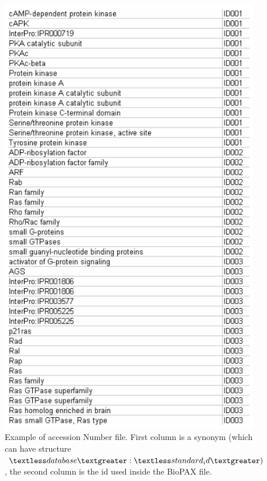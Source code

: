 \begin{figure}[h]
\centering
\includegraphics[width=8 cm]{graphics/Accession_Number_File}
\caption{Example of accession Number file. First column is a synonym (which can have structure $\textless database\textgreater :\textless standard_id\textgreater)$, the second column is the id used inside the BioPAX file.}
\label{Accession_Number_File}
\end{figure}

